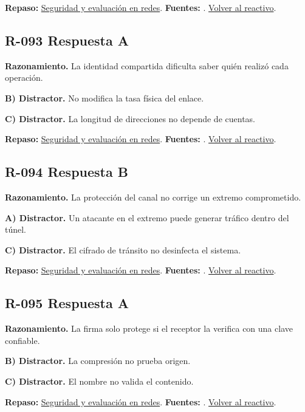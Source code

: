 \textbf{Repaso:} \hyperref[sec:r3]{Seguridad y evaluación en redes}. \textbf{Fuentes:} \cite{nistsecurity,owasp,aes,tls}. \hyperref[q:R-092]{Volver al reactivo}.\par\medskip

\subsection*{R-093 \quad Respuesta A}\label{s:R-093}
\textbf{Razonamiento.} La identidad compartida dificulta saber quién realizó cada operación.

\textbf{B) Distractor. }No modifica la tasa física del enlace.

\textbf{C) Distractor. }La longitud de direcciones no depende de cuentas.

\textbf{Repaso:} \hyperref[sec:r3]{Seguridad y evaluación en redes}. \textbf{Fuentes:} \cite{nistsecurity,owasp,aes,tls}. \hyperref[q:R-093]{Volver al reactivo}.\par\medskip

\subsection*{R-094 \quad Respuesta B}\label{s:R-094}
\textbf{Razonamiento.} La protección del canal no corrige un extremo comprometido.

\textbf{A) Distractor. }Un atacante en el extremo puede generar tráfico dentro del túnel.

\textbf{C) Distractor. }El cifrado de tránsito no desinfecta el sistema.

\textbf{Repaso:} \hyperref[sec:r3]{Seguridad y evaluación en redes}. \textbf{Fuentes:} \cite{nistsecurity,owasp,aes,tls}. \hyperref[q:R-094]{Volver al reactivo}.\par\medskip

\subsection*{R-095 \quad Respuesta A}\label{s:R-095}
\textbf{Razonamiento.} La firma solo protege si el receptor la verifica con una clave confiable.

\textbf{B) Distractor. }La compresión no prueba origen.

\textbf{C) Distractor. }El nombre no valida el contenido.

\textbf{Repaso:} \hyperref[sec:r3]{Seguridad y evaluación en redes}. \textbf{Fuentes:} \cite{nistsecurity,owasp,aes,tls}. \hyperref[q:R-095]{Volver al reactivo}.\par\medskip

